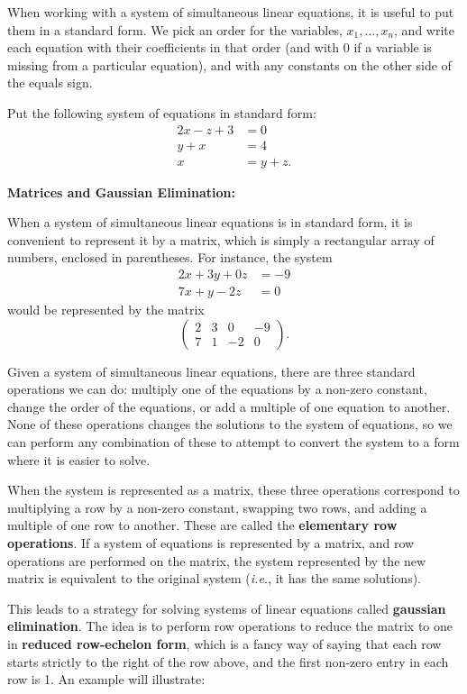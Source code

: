 \documentclass{article}
\begin{document}
When working with a system of simultaneous linear equations, it is useful to put them in a standard form. We pick an order for the variables, $x_1,\hdots,x_n$, and write each equation with their coefficients in that order (and with 0 if a variable is missing from a particular equation), and with any constants on the other side of the equals sign.\medskip

Put the following system of equations in standard form:
\begin{align*}
	2x-z+3&=0\\
	y+x&=4\\
	x&=y+z.
\end{align*}

\clearpage



\textbf{Matrices and Gaussian Elimination:}\bigskip

When a system of simultaneous linear equations is in standard form, it is convenient to represent it by a matrix, which is simply a rectangular array of numbers, enclosed in parentheses. For instance, the system
\begin{align*}
	2x+3y+0z&=-9\\
	7x+y-2z&=0
\end{align*}
would be represented by the matrix
\[\left(\begin{array}{cccc}
		2 & 3 & 0 & -9\\
		7 & 1 & -2 & 0
	\end{array}\right).\]

Given a system of simultaneous linear equations, there are three standard operations we can do: multiply one of the equations by a non-zero constant, change the order of the equations, or add a multiple of one equation to another. None of these operations changes the solutions to the system of equations, so we can perform any combination of these to attempt to convert the system to a form where it is easier to solve.

When the system is represented as a matrix, these three operations correspond to multiplying a row by a non-zero constant, swapping two rows, and adding a multiple of one row to another. These are called the \textbf{elementary row operations}. If a system of equations is represented by a matrix, and row operations are performed on the matrix, the system represented by the new matrix is equivalent to the original system (\textit{i.e.}, it has the same solutions).

This leads to a strategy for solving systems of linear equations called \textbf{gaussian elimination}. The idea is to perform row operations to reduce the matrix to one in \textbf{reduced row-echelon form}, which is a fancy way of saying that each row starts strictly to the right of the row above, and the first non-zero entry in each row is 1. An example will illustrate:\medskip
\end{document}
